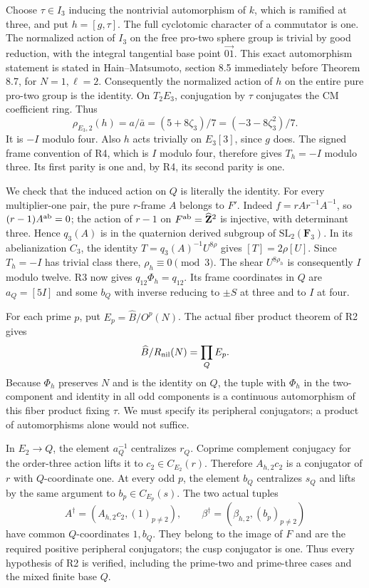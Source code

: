 Choose $\tau\in I_3$ inducing the nontrivial automorphism of
$k$, which is ramified at three, and put $h=[g,\tau]$.
The full cyclotomic character of a commutator is one. The
normalized action of $I_3$ on the free pro-two sphere group is
trivial by good reduction, with the integral tangential base
point $\overrightarrow{01}$. This exact automorphism statement
is stated in Hain--Matsumoto, section 8.5 immediately before
Theorem 8.7, for $N=1,\ell=2$. Consequently the normalized
action of $h$ on the entire pure pro-two group is the identity.
On $T_2E_3$, conjugation by $\tau$ conjugates the CM coefficient
ring. Thus
\[
 \rho_{E_3,2}(h)=a/\bar a=(5+8\zeta_3)/7
                    =(-3-8\zeta_3^2)/7.
\]
It is $-I$ modulo four. Also $h$ acts trivially on $E_3[3]$,
since $g$ does. The signed frame convention of R4, which is
$I$ modulo four, therefore gives $T_h=-I$ modulo three.
Its first parity is one and, by R4, its second parity is one.

We check that the induced action on $Q$ is literally the identity.
For every multiplier-one pair, the pure $r$-frame $A$ belongs
to $F'$. Indeed $f=rAr^{-1}A^{-1}$, so
$(r-1)A^{\rm ab}=0$; the action of $r-1$ on
$F^{\rm ab}=\widehat{\mathbf Z}^2$ is injective, with determinant
three. Hence $q_3(A)$ is in the quaternion derived subgroup of
$\mathrm{SL}_2(\mathbf F_3)$. In its abelianization $C_3$, the
identity $T=q_3(A)^{-1}U^{8\rho}$ gives $[T]=2\rho[U]$.
Since $T_h=-I$ has trivial class there, $\rho_h\equiv0\pmod3$.
The shear $U^{8\rho_h}$ is consequently $I$ modulo twelve.
R3 now gives $q_{12}\Phi_h=q_{12}$. Its frame coordinates in
$Q$ are $a_Q=[5I]$ and some $b_Q$ with inverse reducing to
$\pm S$ at three and to $I$ at four.

For each prime $p$, put $E_p=\widehat B/O^p(N)$. The actual
fiber product theorem of R2 gives
\[
 \widehat B/R_{\rm nil}(N)=\prod_Q E_p.
\]
Because $\Phi_h$ preserves $N$ and is the identity on $Q$,
the tuple with $\Phi_h$ in the two-component and identity in
all odd components is a continuous automorphism of this
fiber product fixing $\tau$. We must specify its peripheral
conjugators; a product of automorphisms alone would not suffice.

In $E_2\to Q$, the element $a_Q^{-1}$ centralizes $r_Q$.
Coprime complement conjugacy for the order-three action lifts
it to $c_2\in C_{E_2}(r)$. Therefore $A_{h,2}c_2$ is a
conjugator of $r$ with $Q$-coordinate one. At every odd $p$,
the element $b_Q$ centralizes $s_Q$ and lifts by the same
argument to $b_p\in C_{E_p}(s)$. The two actual tuples
\[
 A^\dagger=(A_{h,2}c_2,(1)_{p\ne2}),\qquad
 \beta^\dagger=(\beta_{h,2},(b_p)_{p\ne2})
\]
have common $Q$-coordinates $1,b_Q$. They belong to the image
of $F$ and are the required positive peripheral conjugators;
the cusp conjugator is one. Thus every hypothesis of R2 is
verified, including the prime-two and prime-three cases and
the mixed finite base $Q$.

